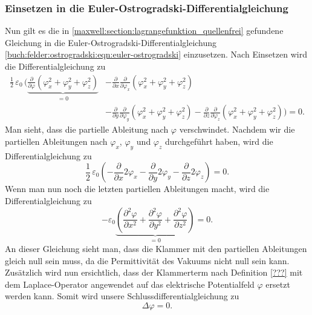 \subsubsection{Einsetzen in die Euler-Ostrogradski-Differentialgleichung}
Nun gilt es die in \eqref{maxwell:section:lagrangefunktion_quellenfrei} gefundene Gleichung in die Euler-Ostrogradski-Differentialgleichung \eqref{buch:felder:ostrogradski:eqn:euler-ostrogradski} einzusetzen.
Nach Einsetzen wird die Differentialgleichung zu
\begin{align*}
\frac{1}{2}\,\varepsilon_0\,\biggl(\underbrace{\frac{\partial}{\partial\varphi}\left(\varphi_x^2 + \varphi_y^2 + \varphi_z^2\right)}_{\displaystyle=0} &- \frac{\partial}{\partial x}\frac{\partial}{\partial \varphi_x}\left(\varphi_x^2 + \varphi_y^2 + \varphi_z^2\right)\\
&- \frac{\partial}{\partial y}\frac{\partial}{\partial \varphi_y}\left(\varphi_x^2 + \varphi_y^2 + \varphi_z^2\right) - 
\frac{\partial}{\partial z}\frac{\partial}{\partial \varphi_z}\left(\varphi_x^2 + \varphi_y^2 + \varphi_z^2\right)\biggr)
=
0.
\end{align*}
Man sieht, dass die partielle Ableitung nach $\varphi$ verschwindet.
Nachdem wir die partiellen Ableitungen nach $\varphi_x$, $\varphi_y$ und $\varphi_z$ durchgeführt haben, wird die Differentialgleichung zu
\[
\frac{1}{2}\,\varepsilon_0\left(-\frac{\partial}{\partial x}2\varphi_x - \frac{\partial}{\partial y}2\varphi_y - \frac{\partial}{\partial z}2\varphi_z\right)
=
0.
\]
Wenn man nun noch die letzten partiellen Ableitungen macht, wird die Differentialgleichung zu
\begin{equation}
	- \varepsilon_0\underbrace{\left(\frac{\partial^2\varphi}{\partial x^2} + \frac{\partial^2\varphi}{\partial y^2} + \frac{\partial^2\varphi}{\partial z^2}\right)}_{\displaystyle=0}
	=
	0.
	\label{maxwell:section:laplace_gleichung_1}
\end{equation}
An dieser Gleichung sieht man, dass die Klammer mit den partiellen Ableitungen gleich null sein muss, da die Permittivität des Vakuums nicht null sein kann.
Zusätzlich wird nun ersichtlich, dass der Klammerterm nach Definition \eqref{???} mit dem Laplace-Operator angewendet auf das elektrische Potentialfeld $\varphi$ ersetzt werden kann.
Somit wird unsere Schlussdifferentialgleichung zu
\begin{equation}
	\Delta\varphi
	=
	0.
	\label{maxwell:section:laplace_gleichung_2}
\end{equation}

